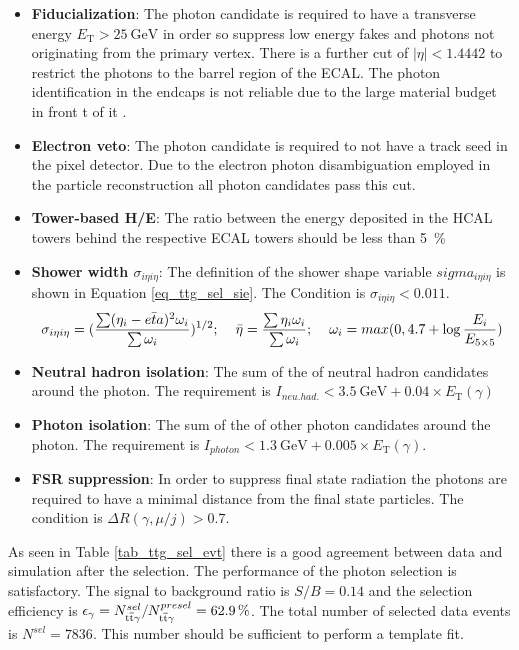 \begin{itemize}
\item \textbf{Fiducialization}: The photon candidate is required to have a transverse energy $E_{\mathrm{T}} > \SI{25}{\giga \electronvolt}$ in order so suppress low energy fakes and photons not originating from the primary vertex. There is a further cut of $| \eta | < 1.4442$ to restrict the photons to the barrel region of the ECAL. The photon identification in the endcaps is not reliable due to the large material budget in front t of it \cite{tholen:ma}.
\item \textbf{Electron veto}: The photon candidate is required to not have a track seed in the pixel detector. Due to the electron photon disambiguation employed in the particle reconstruction all photon candidates pass this cut.
\item \textbf{Tower-based H/E}: The ratio between the energy deposited in the HCAL towers behind the respective ECAL towers should be less than \SI{5}{\percent}
\item \textbf{Shower width $\sigma_{i \eta i \eta}$}: The definition of the shower shape variable $sigma_{i \eta i \eta}$ is shown in Equation \ref{eq_ttg_sel_sie}. The Condition is $\sigma_{i \eta i \eta} < 0.011$.
\begin{equation}
\sigma_{i \eta i \eta} = (\frac{\sum (\eta_i - \bar{eta})^2 \omega_i}{\sum \omega_i})^{1/2} ; \hspace{0.4cm} \bar{\eta} = \frac{\sum \eta_i \omega_i}{\sum \omega_i}; \hspace{0.4cm} \omega_i = max(0,4.7 + \log{\frac{E_i}{E_{5 \times 5}}})
\label{eq_ttg_sel_sie}
\end{equation}
\item \textbf{Neutral hadron isolation}: The sum of the \pt of neutral hadron candidates around the photon. The requirement is $I_{neu.had.} < \SI{3.5}{\giga \electronvolt} + 0.04 \times E_{\mathrm{T}}(\gamma)$  
\item \textbf{Photon isolation}: The sum of the \pt of other photon candidates around the photon. The requirement is $I_{photon} < \SI{1.3}{\giga \electronvolt} + 0.005 \times E_{\mathrm{T}}(\gamma)$. 
\item \textbf{FSR suppression}: In order to suppress final state radiation the photons are required to have a minimal distance from the final state particles. The condition is $\Delta R (\gamma,\mu /j) > 0.7$.
\end{itemize}

As seen in Table \ref{tab_ttg_sel_evt} there is a good agreement between data and simulation after the selection. The performance of the photon selection is satisfactory. The signal to background ratio is $S/B = 0.14$ and the \ttgamma selection efficiency is $\epsilon_\gamma = N^{sel}_{\mathrm{t}\overline{\mathrm{t}} \gamma} / N^{presel}_{\mathrm{t}\overline{\mathrm{t}} \gamma} = \SI{62.9}{\percent}$. The total number of selected data events is $N^{sel} = 7836$. This number should be sufficient to perform a template fit.

